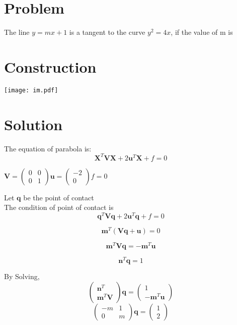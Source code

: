 \documentclass[10pt, a4paper]{article}
\title{\mytitle}
\author{\myauthor\hspace{1em}\\\contact\\FWC22040\hspace{6.5em}IITH\hspace{0.5em}\mymodule\hspace{6em}ASSIGN-6}
\date{}
\newcommand{\myvec}[1]{\ensuremath{\begin{pmatrix}#1\end{pmatrix}}}
\let\vec\mathbf
\begin{document}
 \maketitle
 \tableofcontents
 \section{Problem}
 The line $y=mx+1$ is a tangent to the curve $y^2 = 4x$, if the value of m is

\section{Construction}
\texttt{[image: im.pdf]}
\section{Solution}
The equation of parabola is:
\begin{equation}
    \vec{X}^T\vec{V}\vec{X} + 2\vec{u}^T\vec{X} + f = 0
\end{equation}
\begin{center}
    $\vec{V} = \myvec{0&0\\0&1} \vec{u} = \myvec{-2\\0} f = 0$

\end{center}

Let $\vec{q}$ be the point of contact \\
The condition of point of contact is
\begin{equation}
\vec{q}^T\vec{V}\vec{q} + 2\vec{u}^T\vec{q} + f = 0
\end{equation}



\begin{equation}
    \vec{m}^T(\vec{V}\vec{q}+\vec{u})=0
\end{equation}

\begin{equation}
        \vec{m}^T\vec{V}\vec{q} = -\vec{m}^T\vec{u}
\end{equation}

\begin{equation}
        \vec{n}^T\vec{q} = 1
\end{equation}

By Solving,
\begin{equation}
        \myvec{\vec{n}^T \\ \vec{m}^T\vec{V}} \vec{q} = \myvec{1\\ -\vec{m}^T\vec{u}}
\end{equation}
\begin{equation}
        \myvec{-m & 1 \\ 0 & m}\vec{q} = \myvec{1 \\ 2}
\end{equation}
\end{document}
